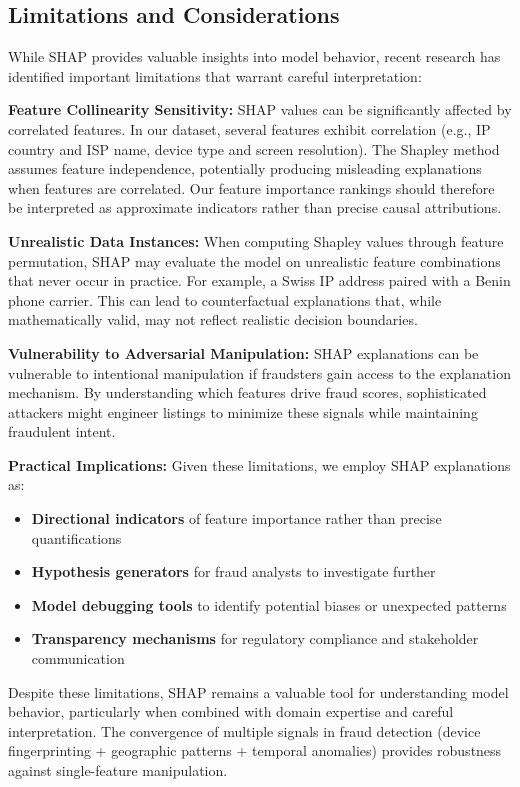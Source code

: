\subsection{Limitations and Considerations}

While SHAP provides valuable insights into model behavior, recent research \cite{kumar2023perspective} has identified important limitations that warrant careful interpretation:

\textbf{Feature Collinearity Sensitivity:} SHAP values can be significantly affected by correlated features. In our dataset, several features exhibit correlation (e.g., IP country and ISP name, device type and screen resolution). The Shapley method assumes feature independence, potentially producing misleading explanations when features are correlated. Our feature importance rankings should therefore be interpreted as approximate indicators rather than precise causal attributions.

\textbf{Unrealistic Data Instances:} When computing Shapley values through feature permutation, SHAP may evaluate the model on unrealistic feature combinations that never occur in practice. For example, a Swiss IP address paired with a Benin phone carrier. This can lead to counterfactual explanations that, while mathematically valid, may not reflect realistic decision boundaries.

\textbf{Vulnerability to Adversarial Manipulation:} SHAP explanations can be vulnerable to intentional manipulation if fraudsters gain access to the explanation mechanism. By understanding which features drive fraud scores, sophisticated attackers might engineer listings to minimize these signals while maintaining fraudulent intent.

\textbf{Practical Implications:} Given these limitations, we employ SHAP explanations as:
\begin{itemize}
    \item \textbf{Directional indicators} of feature importance rather than precise quantifications
    \item \textbf{Hypothesis generators} for fraud analysts to investigate further
    \item \textbf{Model debugging tools} to identify potential biases or unexpected patterns
    \item \textbf{Transparency mechanisms} for regulatory compliance and stakeholder communication
\end{itemize}

Despite these limitations, SHAP remains a valuable tool for understanding model behavior, particularly when combined with domain expertise and careful interpretation. The convergence of multiple signals in fraud detection (device fingerprinting + geographic patterns + temporal anomalies) provides robustness against single-feature manipulation.
